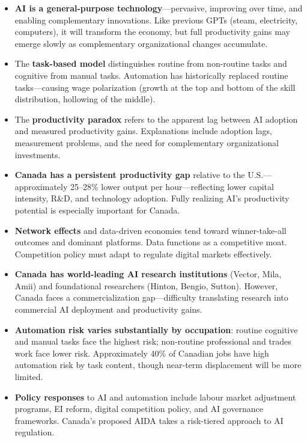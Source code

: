 \begin{itemize}
  \item \textbf{AI is a general-purpose technology}---pervasive, improving over time, and enabling complementary innovations. Like previous GPTs (steam, electricity, computers), it will transform the economy, but full productivity gains may emerge slowly as complementary organizational changes accumulate.
  \item The \textbf{task-based model} distinguishes routine from non-routine tasks and cognitive from manual tasks. Automation has historically replaced routine tasks---causing wage polarization (growth at the top and bottom of the skill distribution, hollowing of the middle).
  \item The \textbf{productivity paradox} refers to the apparent lag between AI adoption and measured productivity gains. Explanations include adoption lags, measurement problems, and the need for complementary organizational investments.
  \item \textbf{Canada has a persistent productivity gap} relative to the U.S.---approximately 25--28\% lower output per hour---reflecting lower capital intensity, R\&D, and technology adoption. Fully realizing AI's productivity potential is especially important for Canada.
  \item \textbf{Network effects} and data-driven economies tend toward winner-take-all outcomes and dominant platforms. Data functions as a competitive moat. Competition policy must adapt to regulate digital markets effectively.
  \item \textbf{Canada has world-leading AI research institutions} (Vector, Mila, Amii) and foundational researchers (Hinton, Bengio, Sutton). However, Canada faces a commercialization gap---difficulty translating research into commercial AI deployment and productivity gains.
  \item \textbf{Automation risk varies substantially by occupation}: routine cognitive and manual tasks face the highest risk; non-routine professional and trades work face lower risk. Approximately 40\% of Canadian jobs have high automation risk by task content, though near-term displacement will be more limited.
  \item \textbf{Policy responses} to AI and automation include labour market adjustment programs, EI reform, digital competition policy, and AI governance frameworks. Canada's proposed AIDA takes a risk-tiered approach to AI regulation.
\end{itemize}

